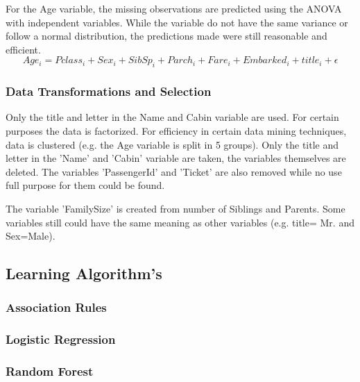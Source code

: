\documentclass{article}
\begin{document}
For the Age variable, the missing observations are predicted using the ANOVA with independent variables. 
While the variable do not have the same variance or follow a normal distribution, the predictions made were 
still reasonable and efficient. 
\begin{equation}
    Age_i= Pclass_i + Sex_i + SibSp_i + Parch_i + Fare_i + Embarked_i + title_i + \epsilon 
\end{equation}


\subsubsection{Data Transformations and Selection}

Only the title and letter in the Name and Cabin variable are used. For certain purposes the data is factorized.
For efficiency in certain data mining techniques, data is clustered (e.g. the Age variable is split in 5 
groups). Only the title and letter in the 'Name' and 'Cabin' variable are taken, the variables themselves are 
deleted. The variables 'PassengerId' and 'Ticket' are also removed while no use full purpose for them could be 
found. 

The variable 'FamilySize' is created from number of Siblings and Parents.
Some variables still could have the same meaning as other variables (e.g. title= Mr. and Sex=Male).




\subsection{Learning Algorithm's}

\subsubsection{Association Rules}

\subsubsection{Logistic Regression}

\subsubsection{Random Forest}
\end{document}
